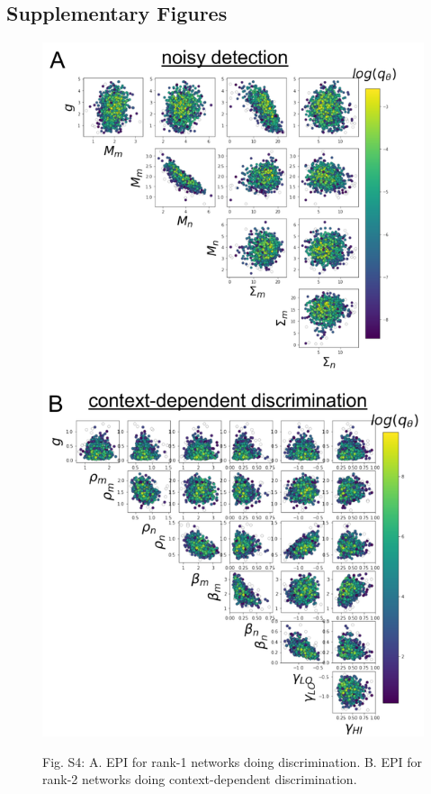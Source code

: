 \documentclass[11pt]{article}
\begin{document}


\subsection{Supplementary Figures}

\begin{figure}
\begin{center}
\includegraphics[scale=0.5]{figures/figS1/figS1.pdf}
\end{center}
Fig. S4: A. EPI for rank-1 networks doing discrimination. B. EPI for rank-2 networks doing context-dependent discrimination.
\end{figure}
\end{document}
